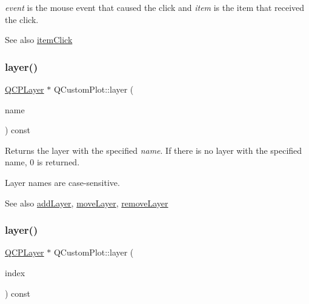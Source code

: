 {\itshape event} is the mouse event that caused the click and {\itshape item} is the item that received the click.

\begin{DoxySeeAlso}{See also}
\mbox{\hyperlink{class_q_custom_plot_ae16b51f52d2b7aebbc7e3e74e6ff2e4b}{item\+Click}} 
\end{DoxySeeAlso}
\mbox{\label{class_q_custom_plot_a0a96244e7773b242ef23c32b7bdfb159}} 
\subsubsection{\texorpdfstring{layer()}{layer()}\hspace{0.1cm}{\footnotesize\ttfamily [1/2]}}
{\footnotesize\ttfamily \mbox{\hyperlink{class_q_c_p_layer}{Q\+C\+P\+Layer}} $\ast$ Q\+Custom\+Plot\+::layer (\begin{DoxyParamCaption}\item[{const Q\+String \&}]{name }\end{DoxyParamCaption}) const}

Returns the layer with the specified {\itshape name}. If there is no layer with the specified name, 0 is returned.

Layer names are case-\/sensitive.

\begin{DoxySeeAlso}{See also}
\mbox{\hyperlink{class_q_custom_plot_ad5255393df078448bb6ac83fa5db5f52}{add\+Layer}}, \mbox{\hyperlink{class_q_custom_plot_ae896140beff19424e9e9e02d6e331104}{move\+Layer}}, \mbox{\hyperlink{class_q_custom_plot_a40f75e342c5eaab6a86066a42a0e2a94}{remove\+Layer}} 
\end{DoxySeeAlso}
\mbox{\label{class_q_custom_plot_acbb570f4c24306e7c2324d40bfe157c2}} 
\subsubsection{\texorpdfstring{layer()}{layer()}\hspace{0.1cm}{\footnotesize\ttfamily [2/2]}}
{\footnotesize\ttfamily \mbox{\hyperlink{class_q_c_p_layer}{Q\+C\+P\+Layer}} $\ast$ Q\+Custom\+Plot\+::layer (\begin{DoxyParamCaption}\item[{int}]{index }\end{DoxyParamCaption}) const}

